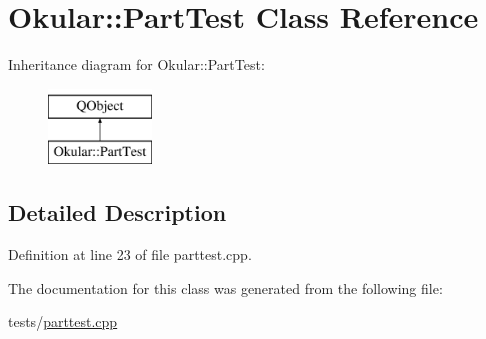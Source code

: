 \hypertarget{classOkular_1_1PartTest}{\section{Okular\+:\+:Part\+Test Class Reference}
\label{classOkular_1_1PartTest}
}
Inheritance diagram for Okular\+:\+:Part\+Test\+:\begin{figure}[H]
\begin{center}
\leavevmode
\includegraphics[height=2.000000cm]{classOkular_1_1PartTest}
\end{center}
\end{figure}


\subsection{Detailed Description}


Definition at line 23 of file parttest.\+cpp.



The documentation for this class was generated from the following file\+:\begin{DoxyCompactItemize}
\item 
tests/\hyperlink{parttest_8cpp}{parttest.\+cpp}\end{DoxyCompactItemize}
